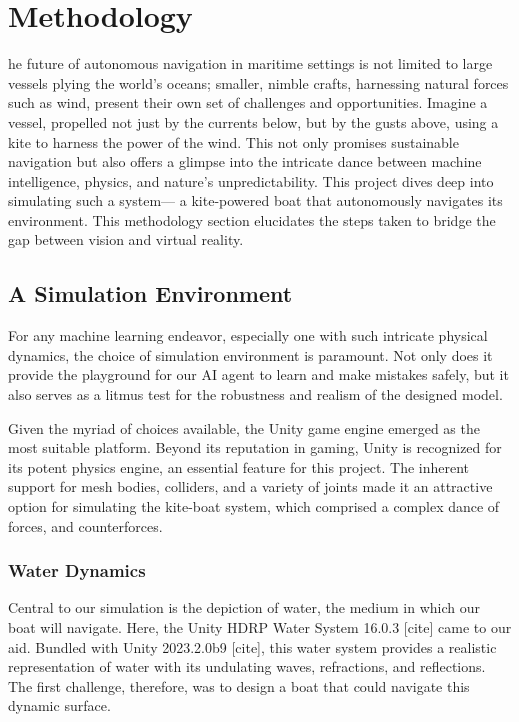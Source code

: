 
%
\let\textcircled=\pgftextcircled
\chapter{Methodology}
\label{chap:aims_and_opjectives}


he future of autonomous navigation in maritime settings is not limited to large vessels plying the world's oceans; smaller, nimble crafts, harnessing natural forces such as wind, present their own set of challenges and opportunities. Imagine a vessel, propelled not just by the currents below, but by the gusts above, using a kite to harness the power of the wind. This not only promises sustainable navigation but also offers a glimpse into the intricate dance between machine intelligence, physics, and nature's unpredictability. This project dives deep into simulating such a system— a kite-powered boat that autonomously navigates its environment. This methodology section elucidates the steps taken to bridge the gap between vision and virtual reality.

\section{A Simulation Environment}
For any machine learning endeavor, especially one with such intricate physical dynamics, the choice of simulation environment is paramount. Not only does it provide the playground for our AI agent to learn and make mistakes safely, but it also serves as a litmus test for the robustness and realism of the designed model.

Given the myriad of choices available, the Unity game engine emerged as the most suitable platform. Beyond its reputation in gaming, Unity is recognized for its potent physics engine, an essential feature for this project. The inherent support for mesh bodies, colliders, and a variety of joints made it an attractive option for simulating the kite-boat system, which comprised a complex dance of forces, and counterforces.

\subsection{Water Dynamics}
Central to our simulation is the depiction of water, the medium in which our boat will navigate. Here, the Unity HDRP Water System 16.0.3 [cite] came to our aid. Bundled with Unity 2023.2.0b9 [cite], this water system provides a realistic representation of water with its undulating waves, refractions, and reflections. The first challenge, therefore, was to design a boat that could navigate this dynamic surface.

